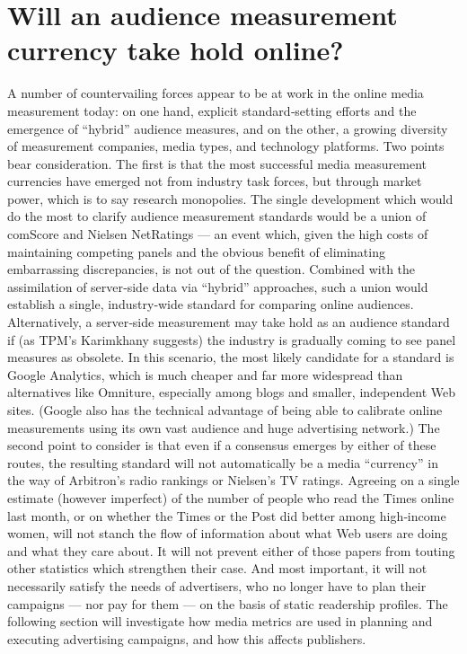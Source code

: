 \section{Will an audience measurement currency take hold online?}
A number of countervailing forces appear to be at work in the online
media measurement today: on one hand, explicit standard‐setting efforts
and the emergence of ``hybrid'' audience measures, and on the other, a
growing diversity of measurement companies, media types, and
technology platforms.
Two points bear consideration. The first is that the most successful media
measurement currencies have emerged not from industry task forces, but
through market power, which is to say research monopolies. The single
development which would do the most to clarify audience measurement
standards would be a union of comScore and Nielsen NetRatings — an
event which, given the high costs of maintaining competing panels and
the obvious benefit of eliminating embarrassing discrepancies, is not out
of the question.
Combined with the assimilation of server‐side data via ``hybrid''
approaches, such a union would establish a single, industry‐wide
standard for comparing online audiences. Alternatively, a server‐side
measurement may take hold as an audience standard if (as TPM’s
Karimkhany suggests) the industry is gradually coming to see panel
measures as obsolete. In this scenario, the most likely candidate for a
standard is Google Analytics, which is much cheaper and far more
widespread than alternatives like Omniture, especially among blogs and
smaller, independent Web sites. (Google also has the technical advantage
of being able to calibrate online measurements using its own vast
audience and huge advertising network.)
The second point to consider is that even if a consensus emerges by either
of these routes, the resulting standard will not automatically be a media
``currency'' in the way of Arbitron’s radio rankings or Nielsen’s TV
ratings. Agreeing on a single estimate (however imperfect) of the number
of people who read the Times online last month, or on whether the Times
or the Post did better among high‐income women, will not stanch the flow
of information about what Web users are doing and what they care about.
It will not prevent either of those papers from touting other statistics
which strengthen their case. And most important, it will not necessarily
satisfy the needs of advertisers, who no longer have to plan their
campaigns — nor pay for them — on the basis of static readership
profiles. The following section will investigate how media metrics are
used in planning and executing advertising campaigns, and how this
affects publishers.
